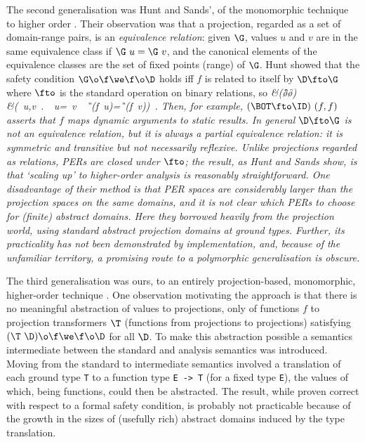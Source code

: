 The second generalisation was Hunt and Sands', of the monomorphic
technique to higher order \cite{HS91}.  Their observation was that a
projection, regarded as a set of domain-range pairs, is an {\it
equivalence relation\/}:  given $\G$, values $u$ and $v$ are in the
same equivalence class if $\G~u=\G~v$, and the canonical elements of
the equivalence classes are the set of fixed points (range) of $\G$.
Hunt showed that the safety condition $\G\o\f\we\f\o\D$ holds iff $f$
is related to itself by $\D\fto\G$ where $\fto$ is the standard
operation on binary relations, so
\beqs
\it &\it (\G\o\f\we\f\o\D)\\
\it \Leftrightarrow&\it (\forall\ u,v\ .\ \D\ u=\D\ v\ \Rightarrow\ \G\ (f\ u)=\G\ (f\ v))\ .
\eeqs
Then, for example, $(\BOT\fto\ID)~(f,f)$ asserts that $f$ maps dynamic
arguments to static results.  In general $\D\fto\G$ is not an
equivalence relation, but it is always a {\it partial\/} equivalence
relation: it is symmetric and transitive but not necessarily
reflexive.  Unlike projections regarded as relations, PERs are closed
under $\fto$; the result, as Hunt and Sands show, is that `scaling up'
to higher-order analysis is reasonably straightforward.  One
disadvantage of their method is that PER spaces are considerably larger
than the projection spaces on the same domains, and it is not clear
which PERs to choose for (finite) abstract domains.  Here they borrowed
heavily from the projection world, using standard abstract projection
domains at ground types.  Further, its practicality has not been
demonstrated by implementation, and, because of the unfamiliar
territory, a promising route to a polymorphic generalisation is obscure.

The third generalisation was ours, to an entirely projection-based,
monomorphic, higher-order technique \cite{Dav93b}.  One observation
motivating the approach is that there is no meaningful abstraction of
values to projections, only of functions $f$ to projection transformers
$\T$ (functions from projections to projections) satisfying
$(\T~\D)\o\f\we\f\o\D$ for all $\D$.  To make this abstraction possible
a semantics intermediate between the standard and analysis semantics
was introduced.  Moving from the standard to intermediate semantics
involved a translation of each ground type \mbox{\tt T} to a function type
\mbox{\tt E}\ \mbox{\tt ->}\ \mbox{\tt T} (for a fixed type \mbox{\tt E}), the values of which, being
functions, could then be abstracted.  The result, while proven correct
with respect to a formal safety condition, is probably not practicable
because of the growth in the sizes of (usefully rich) abstract domains
induced by the type translation.

